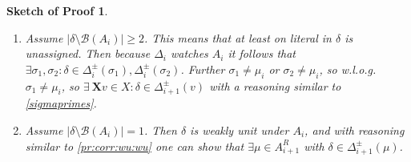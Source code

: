 \documentclass[final]{vutinfth} %
\newtheorem{proof-sketch}{Sketch of Proof}[chapter]
\newcommand{\bass}{\mathcal{B}}
\newcommand{\ass}{A}
\newcommand{\bX}{\mathbf{X}}
\newcommand{\dpm}{\Delta^\pm}
\newcommand{\sgl}{\mu}
\newcommand{\bsgl}{\sigma}
\begin{document}
\begin{proof-sketch}
\begin{enumerate}
\begin{enumerate}
\begin{enumerate}
\item Assume $|\delta \setminus \bass(\ass_i)| \geq 2$. This means that at least on literal in $\delta$ is unassigned. Then because $\Delta_i$ watches $A_i$ it follows that $\exists \bsgl_1, \bsgl_2 : \delta \in \Delta_i^\pm(\bsgl_1), \Delta_i^\pm(\bsgl_2)$. Further $\bsgl_1 \not = \sgl_i$ or $\bsgl_2 \not = \sgl_i$, so w.l.o.g.~$\bsgl_1 \not = \sgl_i$, so $\exists \ {\bX v} \in X : \delta \in \Delta_{i+1}^\pm(v)$ with a reasoning similar to \ref{sigmaprimes}.

\item Assume $|\delta \setminus \bass(\ass_i)| = 1$. Then $\delta$ is weakly unit under $A_i$, and with reasoning similar to \ref{pr:corr:wu:wu} one can show that $\exists \sgl \in \ass^R_{i+1}$ with $\delta \in \dpm_{i+1}(\sgl)$.
\end{enumerate}

\end{enumerate}

\end{enumerate}


\end{proof-sketch}
\end{document}
